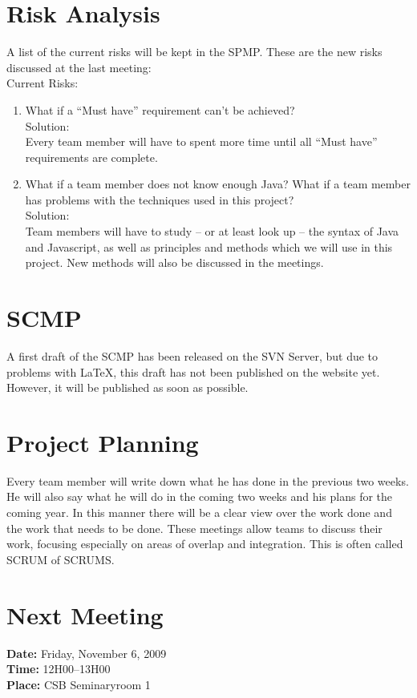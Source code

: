 \documentclass[a4paper, 12pt]{article}
\begin{document}
	\section{Risk Analysis}
A list of the current risks will be kept in the SPMP\cite{site2}. These are the new risks discussed at the last meeting:\\
	Current Risks:
		\begin{enumerate}
		\item  What if a ``Must have'' requirement can't be achieved?\\
		Solution:\\
Every team member will have to spent more time until all ``Must have'' requirements are complete. 
		\item  What if a team member does not know enough Java? What if a team member has problems with the techniques used in this project?\\
		Solution:\\
Team members will have to study -- or at least look up -- the syntax of Java and Javascript, as well as principles and methods which we will use in this project. New methods will also be discussed in the meetings.
		\end{enumerate}
	\section{SCMP}
A first draft of the SCMP has been released on the SVN Server, but due to problems with \LaTeX{}, this draft has not been published on the website yet. However, it will be published as soon as possible.

	\section{Project Planning}
Every team member will write down what he has done in the previous two weeks. He will also say what he will do in the coming two weeks and his plans for the coming year. In this manner there will be a clear view over the work done and the work that needs to be done. These meetings allow teams to discuss their work, focusing especially on areas of overlap and integration. This is often called SCRUM of SCRUMS.
		
	\section{Next Meeting}

		\textbf{Date:} Friday, November 6, 2009\\
		\textbf{Time:} 12H00--13H00\\
		\textbf{Place:} CSB Seminaryroom 1\\
	
\end{document}
